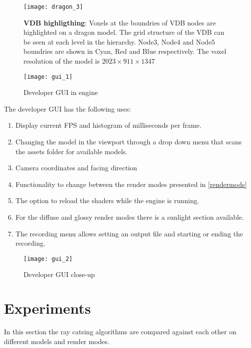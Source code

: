 \begin{figure}[H]
  \centering
  \texttt{[image: dragon\_3]}
  \caption{\textbf{VDB highligthing}: Voxels at the boundries of VDB nodes are highlighted on a dragon model. The grid structure of the VDB can be seen at each level in the hierarchy. Node3, Node4 and Node5 boundries are shown in Cyan, Red and Blue respectively. The voxel resolution of the model is $2023\times911\times1347$}
\end{figure}

\begin{multicols}{2}[]
  \begin{figure}[H]
    \centering
    \texttt{[image: gui\_1]}
    \caption{Developer GUI in engine}
  \end{figure}
  The developer GUI has the following uses:
  \begin{enumerate}[itemstep=0mm]
    \item Display current \acrshort{FPS} and histogram of milliseconds per frame.
    \item Changing the model in the viewport through a drop down menu that scans the assets folder for available models.
    \item Camera coordinates and facing direction
    \item Functionality to change between the render modes presented in \cref{rendermods}
    \item The option to reload the shaders while the engine is running.
    \item For the diffuse and glossy render modes there is a sunlight section available.
    \item The recording menu allows setting an output file and starting or ending the recording.
  \end{enumerate}
  \columnbreak
  \begin{figure}[H]
    \centering
    \texttt{[image: gui\_2]}
    \caption{Developer GUI close-up}
    \label{gui}
  \end{figure}
\end{multicols}

\section{Experiments}
In this section the ray catsing algorithms are compared against each other on different models and render modes.

